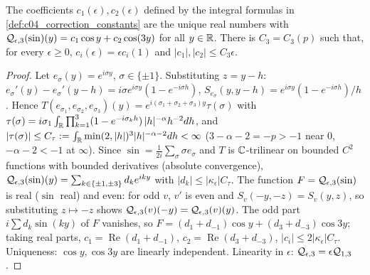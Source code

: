 \begin{lemma}
  \label{lem:c04_cubic_sine_response}
  The coefficients $c_1(\epsilon),c_2(\epsilon)$ defined by the integral formulas in
  \cref{def:c04_correction_constants} are the unique real numbers with
  $\mathcal{Q}_{\epsilon,3}(\sin)(y)=c_1\cos y+c_2\cos(3y)$ for all $y\in\mathbb{R}$.
  There is $C_3=C_3(p)$ such that, for every $\epsilon\ge0$,
  $c_i(\epsilon)=\epsilon c_i(1)$ and $|c_1|,|c_2|\le C_3\epsilon$.
\end{lemma}
\begin{proof}
  Let $e_\sigma(y)=e^{i\sigma y}$, $\sigma\in\{\pm1\}$. Substituting $z=y-h$: $e_\sigma'(y)-e_\sigma'(y-h)=i\sigma e^{i\sigma y}(1-e^{-i\sigma h})$,
  $S_{e_\sigma}(y,y-h)=e^{i\sigma y}(1-e^{-i\sigma h})/h$. Hence
  $T(e_{\sigma_1},e_{\sigma_2},e_{\sigma_3})(y)=e^{i(\sigma_1+\sigma_2+\sigma_3)y}\tau(\sigma)$ with
  $\tau(\sigma)=i\sigma_1\int_{\mathbb{R}}\prod_{k=1}^3(1-e^{-i\sigma_kh})\,|h|^{-\alpha}h^{-2}dh$, and $|\tau(\sigma)|\le C_\tau:=\int_{\mathbb{R}}\min(2,|h|)^3|h|^{-\alpha-2}dh<\infty$
  ($3-\alpha-2=-p>-1$ near $0$, $-\alpha-2<-1$ at $\infty$). Since $\sin=\frac1{2i}\sum_\sigma\sigma e_\sigma$ and $T$ is $\mathbb{C}$-trilinear on bounded
  $C^2$ functions with bounded derivatives (absolute convergence),
  $\mathcal{Q}_{\epsilon,3}(\sin)(y)=\sum_{k\in\{\pm1,\pm3\}}d_ke^{iky}$ with $|d_k|\le|\kappa_\epsilon|C_\tau$. The function $F=\mathcal{Q}_{\epsilon,3}(\sin)$ is real
  ($\sin$ real) and even: for odd $v$, $v'$ is even and $S_v(-y,-z)=S_v(y,z)$, so substituting $z\mapsto-z$ shows
  $\mathcal{Q}_{\epsilon,3}(v)(-y)=\mathcal{Q}_{\epsilon,3}(v)(y)$. The odd part $i\sum d_k\sin(ky)$ of $F$ vanishes, so
  $F=(d_1+d_{-1})\cos y+(d_3+d_{-3})\cos3y$; taking real parts, $c_1=\operatorname{Re}(d_1+d_{-1})$, $c_2=\operatorname{Re}(d_3+d_{-3})$,
  $|c_i|\le2|\kappa_\epsilon|C_\tau$. Uniqueness: $\cos y,\cos3y$ are linearly independent. Linearity in $\epsilon$: $\mathcal{Q}_{\epsilon,3}=\epsilon\mathcal{Q}_{1,3}$.
\end{proof}

